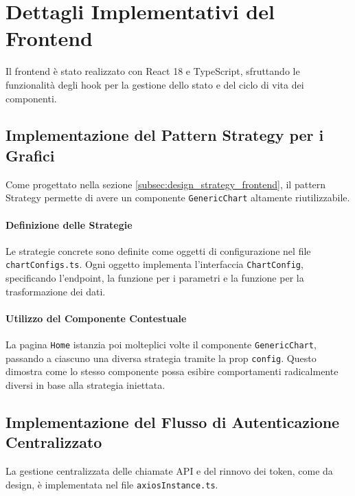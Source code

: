 \documentclass[12pt,a4paper,openright,twoside]{book}
\begin{document}

\section{Dettagli Implementativi del Frontend}
\label{sec:impl_frontend}
Il frontend è stato realizzato con React 18 e TypeScript, sfruttando le funzionalità degli hook per la gestione dello stato e del ciclo di vita dei componenti.

\subsection{Implementazione del Pattern Strategy per i Grafici}
\label{subsec:impl_strategy_frontend}
Come progettato nella sezione \ref{subsec:design_strategy_frontend}, il pattern Strategy permette di avere un componente \texttt{GenericChart} altamente riutilizzabile.

\paragraph{Definizione delle Strategie}
Le strategie concrete sono definite come oggetti di configurazione nel file \texttt{chartConfigs.ts}. Ogni oggetto implementa l'interfaccia \texttt{ChartConfig}, specificando l'endpoint, la funzione per i parametri e la funzione per la trasformazione dei dati.


\paragraph{Utilizzo del Componente Contestuale}
La pagina \texttt{Home} istanzia poi molteplici volte il componente \texttt{GenericChart}, passando a ciascuno una diversa strategia tramite la prop \texttt{config}. Questo dimostra come lo stesso componente possa esibire comportamenti radicalmente diversi in base alla strategia iniettata.


\subsection{Implementazione del Flusso di Autenticazione Centralizzato}
\label{subsec:impl_auth_frontend}
La gestione centralizzata delle chiamate API e del rinnovo dei token, come da design, è implementata nel file \texttt{axiosInstance.ts}.
\end{document}
